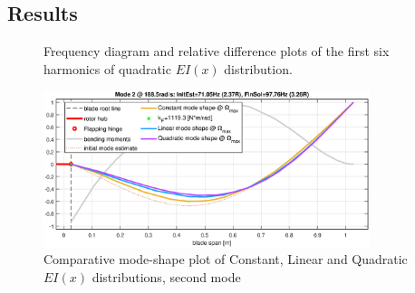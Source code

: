 \documentclass[11pt]{article}
\begin{document}
\subsection{Results}
\begin{figure}[H]
    \centering
    \qquad
    \caption{Frequency diagram and relative difference plots of the first six harmonics of quadratic $EI(x)$ distribution.}
\end{figure}

\begin{figure}[H]
    \centering
    \includegraphics[width=0.85\textwidth]{mode2compare.eps}
    \caption{Comparative mode-shape plot of Constant, Linear and Quadratic $EI(x)$ distributions, second mode}
    \label{fig:bvpcomp}
\end{figure}{}
\end{document}
